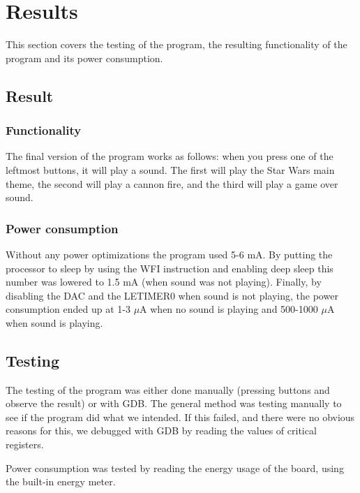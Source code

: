 \section{Results}\label{chapter:Results and Tests}

This section covers the testing of the program, the resulting functionality of the program and its power consumption.

\subsection{Result}

\subsubsection{Functionality}
The final version of the program works as follows: when you press one of the leftmost buttons, it will play a sound. The first will play the Star Wars main theme, the second will play a cannon fire, and the third will play a game over sound.

\subsubsection{Power consumption}

Without any power optimizations the program used 5-6 mA. By putting the processor to sleep by using the WFI instruction and enabling deep sleep this number was lowered to 1.5 mA (when sound was not playing). Finally, by disabling the DAC and the LETIMER0 when sound is not playing, the power consumption ended up at 1-3 $\mu$A when no sound is playing and 500-1000 $\mu$A when sound is playing. 

\subsection{Testing}

The testing of the program was either done manually (pressing buttons and observe the result) or with GDB. The general method was testing manually to see if the program did what we intended. If this failed, and there were no obvious reasons for this, we debugged with GDB by reading the values of critical registers. 

Power consumption was tested by reading the energy usage of the board, using the built-in energy meter.




